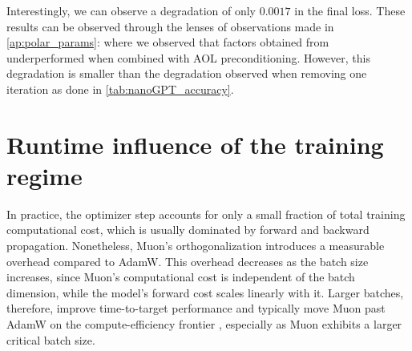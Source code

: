     Interestingly, we can observe a degradation of only $0.0017$ in the final loss. These results can be observed through the lenses of observations made in \cref{ap:polar_params}: where we observed that factors obtained from \cite{amsel2025polar, grishina_accelerating_2025} underperformed when combined with AOL preconditioning. However, this degradation is smaller than the degradation observed when removing one iteration as done in \cref{tab:nanoGPT_accuracy}.

    
\section{Runtime influence of the training regime}
\label{ap:trainingregimes}
In practice, the optimizer step accounts for only a small fraction of total training computational cost, which is usually dominated by forward and backward propagation. Nonetheless, Muon’s orthogonalization introduces a measurable overhead compared to AdamW. This overhead decreases as the batch size increases, since Muon’s computational cost is independent of the batch dimension, while the model’s forward cost scales linearly with it. Larger batches, therefore, improve time-to-target performance and typically move Muon past AdamW on the compute-efficiency frontier \cite{shah2025practical}, especially as Muon exhibits a larger critical batch size\cite{wen_fantastic_2025}.


